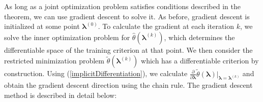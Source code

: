 \documentclass[10pt,letterpaper]{article}
\begin{document}
As long as a joint optimization problem satisfies conditions described in the theorem, we can use gradient descent to solve it. As before, gradient descent is initialized at some point $\boldsymbol{\lambda}^{(0)}$. To calculate the gradient at each iteration $k$, we solve the inner optimization problem for $\hat \theta(\boldsymbol{\lambda}^{(k)})$, which determines the differentiable space of the training criterion at that point. We then consider the restricted minimization problem $\tilde \theta(\boldsymbol{\lambda}^{(k)})$ which has a differentiable criterion by construction. Using (\ref{implicitDifferentiation}), we calculate $\frac{\partial}{\partial \boldsymbol{\lambda}} \tilde{\theta}(\boldsymbol{\lambda})|_{\boldsymbol{\lambda} = \boldsymbol{\lambda}^{(k)}}$ and obtain the gradient descent direction using the chain rule. The gradient descent method is described in detail below:
\end{document}

